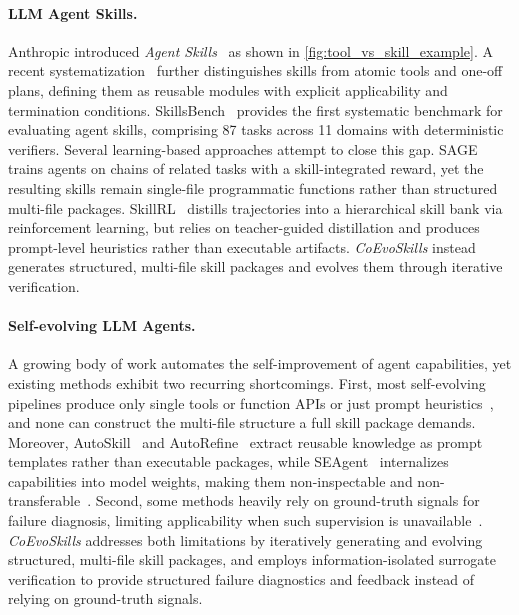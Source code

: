 \documentclass{article}
\newcommand{\method}{\textit{CoEvoSkills}\xspace}
\newcommand{\bench}{SkillsBench\xspace}
\begin{document}
\paragraph{LLM Agent Skills.}
Anthropic introduced \emph{Agent Skills}~\citep{anthropic2025skills} as shown in \autoref{fig:tool_vs_skill_example}.
A recent systematization~\citep{jiang2026sok} further distinguishes skills from atomic tools and one-off plans, defining them as reusable modules with explicit applicability and termination conditions.
\bench~\citep{li2026skillsbench} provides the first systematic benchmark for evaluating agent skills, comprising 87 tasks across 11 domains with deterministic verifiers.
Several learning-based approaches attempt to close this gap.
SAGE~\citep{wang2025sage} trains agents on chains of related tasks with a skill-integrated reward, yet the resulting skills remain single-file programmatic functions rather than structured multi-file packages.
SkillRL~\citep{xia2026skillrl} distills trajectories into a hierarchical skill bank via reinforcement learning, but relies on teacher-guided distillation and produces prompt-level heuristics rather than executable artifacts.
\method instead generates structured, multi-file skill packages and evolves them through iterative verification.


\paragraph{Self-evolving LLM Agents.}
A growing body of work automates the self-improvement of agent capabilities, yet existing methods exhibit two recurring shortcomings.
First, most self-evolving pipelines produce only single tools or function APIs or just prompt heuristics~\citep{wang2024voyager, li2026yunjueagenttechreport, xia2025live, lu2026statictoolstesttimetool, chen2026skillcraftllmagentslearn, he2026evotest}, and none can construct the multi-file structure a full skill package demands.
Moreover, AutoSkill~\citep{yang2026autoskill} and AutoRefine~\citep{qiu2026autorefine} extract reusable knowledge as prompt templates rather than executable packages, while SEAgent~\citep{sun2025seagent} internalizes capabilities into model weights, making them non-inspectable and non-transferable~\citep{jiang2026sok}.
Second, some methods heavily rely on ground-truth signals for failure diagnosis, limiting applicability when such supervision is unavailable~\citep{alzubi2026evoskillautomatedskilldiscovery,sun2025seagent}.
\method addresses both limitations by iteratively generating and evolving structured, multi-file skill packages, and employs information-isolated surrogate verification to provide structured failure diagnostics and feedback instead of relying on ground-truth signals.
\end{document}
